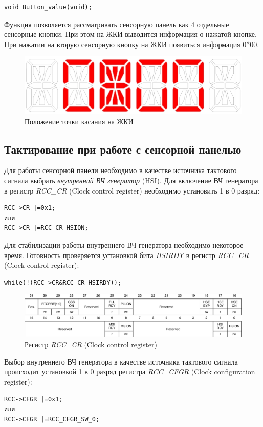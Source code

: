 \begin{verbatim}
void Button_value(void);
\end{verbatim}
Функция позволяется рассматривать сенсорную панель как 4 отдельные сенсорные кнопки. При этом на ЖКИ выводится информация о нажатой кнопке. При нажатии на вторую сенсорную кнопку на ЖКИ появиться информация 0*00.

\begin{figure}[H]
\begin{center}
\includegraphics[scale=0.3]{Image/73.jpg} 
\end{center}
\caption{Положение точки касания на ЖКИ}
\end{figure}

\subsection{Тактирование при работе с сенсорной панелью}
Для работы сенсорной панели необходимо в качестве источника тактового сигнала выбрать \textit{внутренний ВЧ генератор} (HSI). Для включение ВЧ генератора в регистр \textit{RCC\_CR} (Clock control register) необходимо установить 1 в 0 разряд:
\begin{verbatim}
RCC->CR |=0x1;
или
RCC->CR |=RCC_CR_HSION;
\end{verbatim}
Для стабилизации работы внутреннего ВЧ генератора необходимо некоторое время. Готовность проверяется установкой бита \textit{HSIRDY} в регистр \textit{RCC\_CR} (Clock control register):
\begin{verbatim}
while(!(RCC->CR&RCC_CR_HSIRDY));
\end{verbatim}

\begin{figure}[H]
\begin{center}
\includegraphics[scale=0.25]{Image/74.jpg} 
\end{center}
\caption{Регистр \textit{RCC\_CR} (Clock control register) }
\end{figure}
Выбор внутреннего ВЧ генератора в качестве источника тактового сигнала происходит установкой 1 в 0 разряд регистра \textit{RCC\_CFGR} (Clock configuration register):
\begin{verbatim}
RCC->CFGR |=0x1; 
или
RCC->CFGR |=RCC_CFGR_SW_0; 
\end{verbatim}

